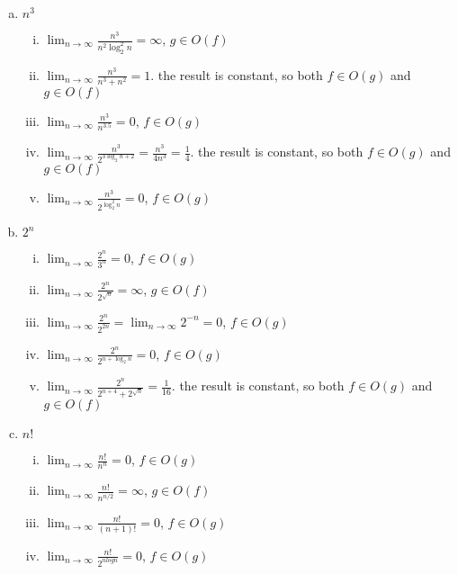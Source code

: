 \documentclass{article}
\def\math#1{$#1$}
\begin{document}
\begin{enumerate}[(a)]
    \item \math{n^3}
        \begin{enumerate}[i)]
            \item \math{\lim_{n \to \infty} \frac{n^3}{n^2{\log_2^2 n}} = \infty}, \math{g \in O(f)}
            \item \math{\lim_{n \to \infty} \frac{n^3}{n^3 + n^2} = 1}. the result is constant, so both \math{f \in O(g)} and \math{g \in O(f)}
            \item \math{\lim_{n \to \infty} \frac{n^3}{n^{3.5}} = 0}, \math{f \in O(g)}
            \item \math{\lim_{n \to \infty} \frac{n^3}{2^{3\log_2 n + 2}} = \frac{n^3}{4n^3} = \frac{1}{4}}. the result is constant, so both \math{f \in O(g)} and \math{g \in O(f)}
            \item \math{\lim_{n \to \infty} \frac{n^3}{2^{\log_2^2 n}} = 0}, \math{f \in O(g)}
        \end{enumerate}
    \item \math{2^n}
        \begin{enumerate}[i)]
            \item \math{\lim_{n \to \infty} \frac{2^n}{3^n} = 0}, \math{f \in O(g)}
            \item \math{\lim_{n \to \infty} \frac{2^n}{2^{\sqrt{n}}} = \infty}, \math{g \in O(f)}
            \item \math{\lim_{n \to \infty} \frac{2^n}{2^{2n}} = \lim_{n \to \infty} 2^{-n} =  0}, \math{f \in O(g)}
            \item \math{\lim_{n \to \infty} \frac{2^n}{2^{n+\log_2 n}} = 0}, \math{f \in O(g)}
            \item \math{\lim_{n \to \infty} \frac{2^n}{2^{n+4} + 2^{\sqrt{n}}} = \frac{1}{16}}. the result is constant, so both \math{f \in O(g)} and \math{g \in O(f)}
        \end{enumerate}
    \item \math{n!}
         \begin{enumerate}[i)]
            \item \math{\lim_{n \to \infty} \frac{n!}{n^n} = 0}, \math{f \in O(g)}
            \item \math{\lim_{n \to \infty} \frac{n!}{n^{n/2}} = \infty}, \math{g \in O(f)}
            \item \math{\lim_{n \to \infty} \frac{n!}{(n+1)!} = 0}, \math{f \in O(g)}
            \item \math{\lim_{n \to \infty} \frac{n!}{2^{nlog n}} = 0}, \math{f \in O(g)}

\end{enumerate}
\end{enumerate}
\end{document}
